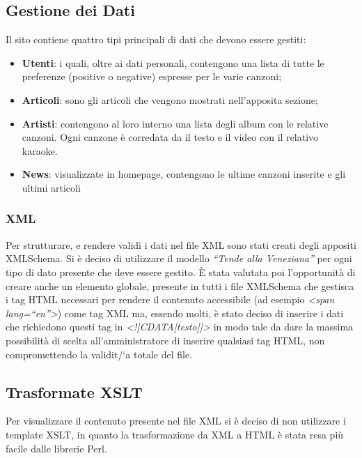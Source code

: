 \subsection{Gestione dei Dati}
Il sito contiene quattro tipi principali di dati che devono essere gestiti:
\begin{itemize}
    \item \textbf{Utenti}: i quali, oltre ai dati personali, contengono una lista di tutte le preferenze (positive o negative) espresse per le varie canzoni;
    \item \textbf{Articoli}: sono gli articoli che vengono mostrati nell'apposita sezione;
    \item \textbf{Artisti}: contengono al loro interno una lista degli album con le relative canzoni. Ogni canzone \`e corredata da il testo e il video con il relativo karaoke.
    \item \textbf{News}: visualizzate in homepage, contengono le ultime canzoni inserite e gli ultimi articoli
\end{itemize}

\subsubsection{XML}

Per strutturare, e rendere validi i dati nel file XML sono stati creati degli appositi XMLSchema.
Si \`e deciso di utilizzare il modello \textit{``Tende alla Veneziana''} per ogni tipo di dato presente che deve essere gestito.
\`E stata valutata poi l'opportunit\`a di creare anche un elemento globale, presente in tutti i file XMLSchema che gestisca i tag HTML necessari per rendere il contenuto accessibile (ad esempio \textit{\textless span lang=``en''\textgreater}) come tag XML ma, essendo molti, \`e stato deciso di inserire i dati che richiedono questi tag in \textit{\textless![CDATA[testo]]\textgreater} in modo tale da dare la massima possibilit\`a di scelta all'amministratore di inserire qualsiasi tag HTML, non compromettendo la validit/`a totale del file.

\subsection{Trasformate XSLT}

Per visualizzare il contenuto presente nel file XML si \`e deciso di non utilizzare i template XSLT, in quanto la trasformazione da XML a HTML \`e stata resa pi\`u facile dalle librerie Perl.
